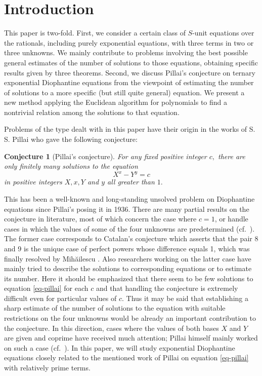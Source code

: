 \documentclass[11pt]{amsart}
\newtheorem{conj}{Conjecture}
\numberwithin{equation}{section}
\begin{document}
\section{Introduction}\label{sec-intro}

This paper is two-fold. 
First, we consider a certain class of $S$-unit equations over the rationals, including purely exponential equations, with three terms in two or three unknowns.
We mainly contribute to problems involving the best possible general estimates of the number of solutions to those equations, obtaining specific results given by three theorems.
Second, %
we discuss Pillai's conjecture on ternary exponential Diophantine equations from the viewpoint of estimating the number of solutions to a more specific (but still quite general) equation.
We present a new method applying the Euclidean algorithm for polynomials to find a nontrivial relation among the solutions to that equation.

Problems of the type dealt with in this paper have their origin in the works of S. S. Pillai \cite{Pi,Pi2} who gave the following conjecture: 

\begin{conj}[Pillai's conjecture]
For any fixed positive integer $c,$ there are only finitely many solutions to the equation
\begin{equation} \label{eq-pillai}
X^x - Y^y =c
\end{equation}
in positive integers $X,x,Y$ and $y$ all greater than $1.$
\end{conj}
This has been a well-known and long-standing unsolved problem on Diophantine equations since Pillai's posing it in 1936.
There are many partial results on the conjecture in literature, most of which concern the case where $c=1$, or handle cases in which the values of some of the four unknowns are predetermined (cf.~\cite{Ri,Wa,BiBuMi}).
The former case corresponds to Catalan's conjecture which asserts that the pair 8 and 9 is the unique case of perfect powers whose difference equals 1, which was finally resolved by Mih\u{a}ilescu \cite{Mih}.
Also researchers working on the latter case have mainly tried to describe the solutions to corresponding equations or to estimate its number.
Here it should be emphasized that there seem to be few solutions to equation \eqref{eq-pillai} for each $c$ and that handling the conjecture is extremely difficult even for particular values of $c$.
Thus it may be said that establishing a sharp estimate of the number of solutions to the equation with suitable restrictions on the four unknowns would be already an important contribution to the conjecture.
In this direction, cases where the values of both bases $X$ and $Y$ are given and coprime have received much attention; Pillai himself mainly worked on such a case (cf.~\cite{Pi, Pi2}).
In this paper, we will study exponential Diophantine equations closely related to the mentioned work of Pillai on equation \eqref{eq-pillai} with relatively prime terms. 
\end{document}
